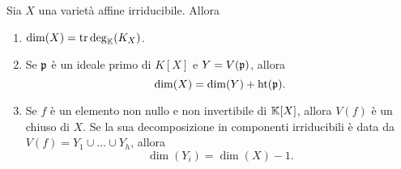 \begin{theorem}
    Sia $X$ una varietà affine irriducibile. Allora \begin{enumerate}
        \item $\dim(X)=\operatorname{tr\,deg}_{\mathbb{K}}(K_X)$. 
        \item Se $\mathfrak{p}$ è un ideale primo di $K[X]$ e $Y=V(\mathfrak{p})$, allora \[\dim(X)=\dim(Y)+\operatorname{ht}(\mathfrak{p}).\]
        \item Se $f$ è un elemento non nullo e non invertibile di $\mathbb{K}[X]$, allora $V(f)$ è un chiuso di $X$. Se la sua decomposizione in componenti irriducibili è data da $V(f)=Y_1\cup\ldots\cup Y_h$, allora \[\dim(Y_i)=\dim(X)-1.\]
    \end{enumerate}
\end{theorem}
